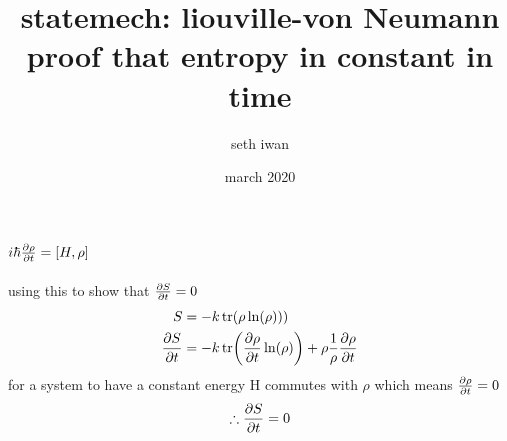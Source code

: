 \documentclass{article}
\title{statemech: liouville-von Neumann proof that entropy in constant in time}
\author{seth iwan }
\date{march 2020}
\newcommand{\nm}{\begin{equation}}
\newcommand{\enm}{\end{equation}}
\begin{document}
\maketitle
\section{$i\hbar \pdv{\rho}{t} =\qty[H,\rho]$}

using this to show that $\pdv{S}{t}=0$
\begin{align*}
S &= -k \tr(\rho\ln(\rho))) \\
\pdv{S}{t} &=-k\tr(\pdv{\rho}{t}\ln(\rho)) + \rho \frac{1}{\rho}\pdv{\rho}{t} \\
\end{align*}
for a system to have a constant energy H commutes with $\rho$ which means $\pdv{\rho}{t}= 0$
\nm
\therefore \pdv{S}{t} =0
\enm
\end{document}
